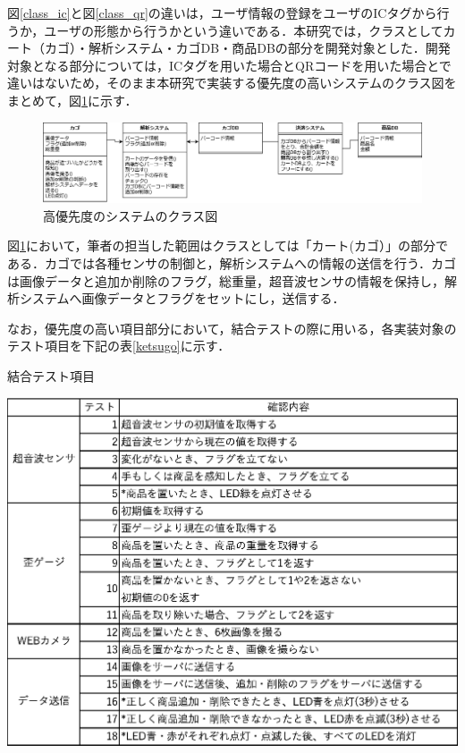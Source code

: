 図\ref{class_ic}と図\ref{class_qr}の違いは，ユーザ情報の登録をユーザのICタグから行うか，ユーザの形態から行うかという違いである．本研究では，クラスとしてカート（カゴ）・解析システム・カゴDB・商品DBの部分を開発対象とした．開発対象となる部分については，ICタグを用いた場合とQRコードを用いた場合とで違いはないため，そのまま本研究で実装する優先度の高いシステムのクラス図をまとめて，図\ref{class_qr_2}に示す．


\begin{figure}[htbp]
\centering
\includegraphics[width=15cm]{./picture/class_final.eps}
\caption{高優先度のシステムのクラス図}
\label{class_qr_2}
\end{figure}


図\ref{class_qr_2}において，筆者の担当した範囲はクラスとしては「カート(カゴ）」の部分である．カゴでは各種センサの制御と，解析システムへの情報の送信を行う．カゴは画像データと追加か削除のフラグ，総重量，超音波センサの情報を保持し，解析システムへ画像データとフラグをセットにし，送信する．

なお，優先度の高い項目部分において，結合テストの際に用いる，各実装対象のテスト項目を下記の表\ref{ketsugo}に示す．

\begin{table}[htbp]
\centering
\caption{結合テスト項目}
\includegraphics[width = 15cm]{./picture/ketsugo.eps}
\label{ketsugo}
\end{table}


